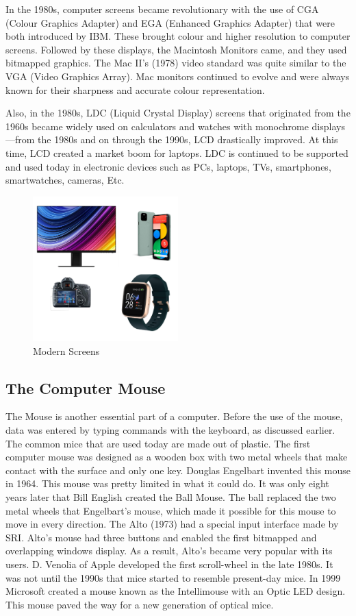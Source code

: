 \documentclass{article}
\begin{document}
In the 1980s, computer screens became revolutionary with the use of CGA (Colour Graphics Adapter) and EGA (Enhanced Graphics Adapter) that were both introduced by IBM. These brought colour and higher resolution to computer screens. Followed by these displays, the Macintosh Monitors came, and they used bitmapped graphics. The Mac II's (1978) video standard was quite similar to the VGA (Video Graphics Array). Mac monitors continued to evolve and were always known for their sharpness and accurate colour representation.

Also, in the 1980s, LDC (Liquid Crystal Display) screens that originated from the 1960s became widely used on calculators and watches with monochrome displays—from the 1980s and on through the 1990s, LCD drastically improved. At this time, LCD created a market boom for laptops. LDC is continued to be supported and used today in electronic devices such as PCs, laptops, TVs, smartphones, smartwatches, cameras, Etc.
\cite{ref5}

\begin{figure}[!h]
    \caption{Modern Screens}
    \label{image:MODERNSCREENS}
    \centering
    \includegraphics[width=0.5\textwidth]{pics/modern_screens.png}
\end{figure}

\subsection{The Computer Mouse}
The Mouse is another essential part of a computer. Before the use of the mouse, data was entered by typing commands with the keyboard, as discussed earlier. The common mice that are used today are made out of plastic. The first computer mouse was designed as a wooden box with two metal wheels that make contact with the surface and only one key. Douglas Engelbart invented this mouse in 1964. This mouse was pretty limited in what it could do. It was only eight years later that Bill English created the Ball Mouse. The ball replaced the two metal wheels that Engelbart's mouse, which made it possible for this mouse to move in every direction. The Alto (1973) had a special input interface made by SRI. Alto's mouse had three buttons and enabled the first bitmapped and overlapping windows display. As a result, Alto's became very popular with its users. D. Venolia of Apple developed the first scroll-wheel in the late 1980s. It was not until the 1990s that mice started to resemble present-day mice. In 1999 Microsoft created a mouse known as the Intellimouse with an Optic LED design. This mouse paved the way for a new generation of optical mice.
\cite{ref6} \cite{ref7}
\end{document}
